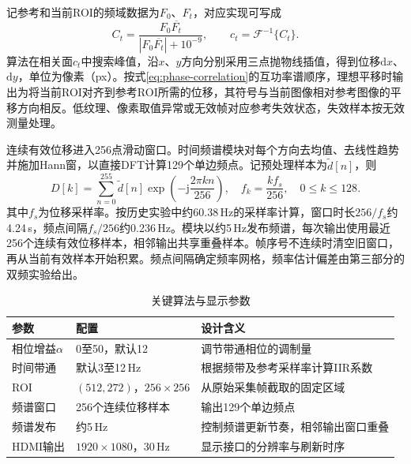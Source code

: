 
记参考和当前ROI的频域数据为$F_0$、$F_t$，对应实现可写成
\begin{equation}
 C_t=\frac{F_0\overline{F_t}}{|F_0\overline{F_t}|+10^{-9}},
 \qquad c_t=\mathcal{F}^{-1}\{C_t\}.
 \label{eq:phase-correlation}
\end{equation}
算法在相关面$c_t$中搜索峰值，沿$x$、$y$方向分别采用三点抛物线插值，得到位移$\mathrm{d}x$、$\mathrm{d}y$，单位为像素（px）。按式\eqref{eq:phase-correlation}的互功率谱顺序，理想平移时输出为将当前ROI对齐到参考ROI所需的位移，其符号与当前图像相对参考图像的平移方向相反。低纹理、像素取值异常或无效帧对应参考失效状态，失效样本按无效测量处理。

连续有效位移进入256点滑动窗口。时间频谱模块对每个方向去均值、去线性趋势并施加Hann窗，以直接DFT计算129个单边频点。记预处理样本为$\widetilde d[n]$，则
\begin{equation}
 D[k]=\sum_{n=0}^{255}\widetilde d[n]\exp\left(-\mathrm{j}\frac{2\pi kn}{256}\right),
 \quad f_k=\frac{kf_s}{256},\quad 0\leq k\leq128.
 \label{eq:temporal-dft}
\end{equation}
其中$f_s$为位移采样率。按历史实验中约60.38\,Hz的采样率计算，窗口时长$256/f_s$约4.24\,s，频点间隔$f_s/256$约0.236\,Hz。模块以约5\,Hz发布频谱，每次输出使用最近256个连续有效位移样本，相邻输出共享重叠样本。帧序号不连续时清空旧窗口，再从当前有效样本开始积累。频点间隔确定频率网格，频率估计偏差由第三部分的双频实验给出。

\begin{table}[htbp]
\centering\small
\caption{关键算法与显示参数}\label{tab:algorithm-parameters}
\begin{tabularx}{\linewidth}{@{}p{3.0cm}p{3.4cm}X@{}}
\toprule
参数 & 配置 & 设计含义 \\
\midrule
相位增益$\alpha$ & 0至50，默认12 & 调节带通相位的调制量 \\
时间带通 & 默认3至12\,Hz & 根据频带及参考采样率计算IIR系数 \\
ROI & $(512,272)$，$256\times256$ & 从原始采集帧截取的固定区域 \\
频谱窗口 & 256个连续位移样本 & 输出129个单边频点 \\
频谱发布 & 约5\,Hz & 控制频谱更新节奏，相邻输出窗口重叠 \\
HDMI输出 & $1920\times1080$，30\,Hz & 显示接口的分辨率与刷新时序 \\
\bottomrule
\end{tabularx}
\end{table}

